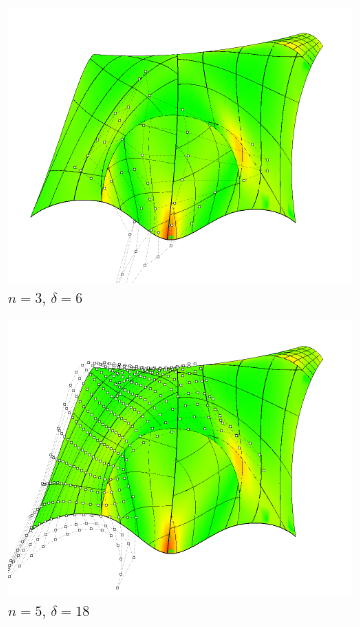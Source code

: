 \documentclass[9pt,academicons]{article}
\begin{document}
\begin{figure}[!ht]
  \begin{subfigure}{.33\textwidth}
    \centering
    \includegraphics[width=\textwidth]{images/pocket/spatch3.png}
    \caption{$n=3$, $\delta=6$}
    \label{fig:pocket-3-sp}
  \end{subfigure}
  \begin{subfigure}{.33\textwidth}
    \centering
    \includegraphics[width=\textwidth]{images/pocket/spatch2.png}
    \caption{$n=5$, $\delta=18$}
    \label{fig:pocket-5-sp}
  \end{subfigure}
  \begin{subfigure}{.33\textwidth}

\end{subfigure}
\end{figure}
\end{document}

